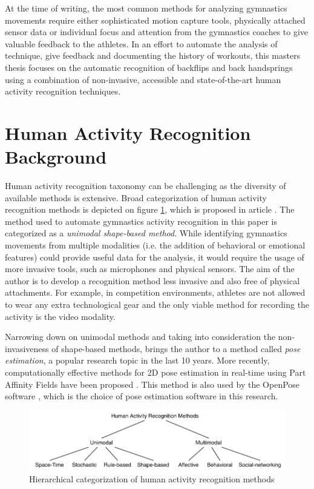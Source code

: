 At the time of writing, the most common methods for analyzing gymnastics movements require either sophisticated motion capture tools, physically attached sensor data or individual focus and attention from the gymnastics coaches to give valuable feedback to the athletes. In an effort to automate the analysis of technique, give feedback and documenting the history of workouts, this masters thesis focuses on the automatic recognition of backflips and back handsprings using a combination of non-invasive, accessible and state-of-the-art human activity recognition techniques.

\section{Human Activity Recognition Background}

Human activity recognition taxonomy can be challenging as the diversity of available methods is extensive. Broad categorization of human activity recognition methods is depicted on figure \ref{har-taxonomy}, which is proposed in article \cite{10.3389/frobt.2015.00028}. The method used to automate gymnastics activity recognition in this paper is categorized as a \textit{unimodal shape-based method}. While identifying gymnastics movements from multiple modalities (i.e. the addition of behavioral or emotional features) could provide useful data for the analysis, it would require the usage of more invasive tools, such as microphones and physical sensors. The aim of the author is to develop a recognition method less invasive and also free of physical attachments. For example, in competition environments, athletes are not allowed to wear any extra technological gear and the only viable method for recording the activity is the video modality. 

Narrowing down on unimodal methods and taking into consideration the non-invasiveness of shape-based methods, brings the author to a method called \textit{pose estimation}, a popular research topic in the last 10 years. More recently, computationally effective methods for 2D pose estimation in real-time using Part Affinity Fields have been proposed \cite{DBLP:journals/corr/CaoSWS16}. This method is also used by the OpenPose software \cite{DBLP:journals/corr/abs-1812-08008}, which is the choice of pose estimation software in this research. 

\begin{figure}[htb]
  \centering
    \includegraphics[width=\textwidth,keepaspectratio]
    {images/introduction/har-taxonomy}
    \caption{Hierarchical categorization of human activity recognition methods}
    \label{har-taxonomy}
\end{figure}


